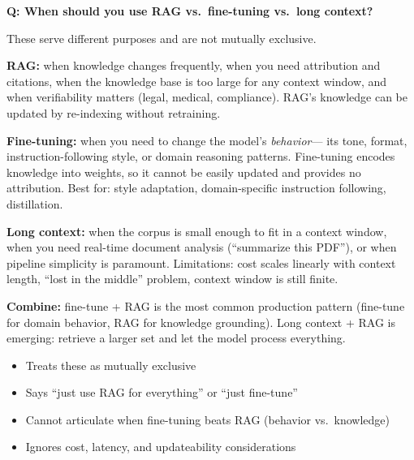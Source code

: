 \begin{interviewq}
\textbf{Q: When should you use RAG vs.\ fine-tuning vs.\ long context?}

 \quad {} \quad \badgefreq{\freqhigh}

\stronganswer
These serve different purposes and are not mutually exclusive.

\textbf{RAG:} when knowledge changes frequently, when you need attribution and
citations, when the knowledge base is too large for any context window, and when
verifiability matters (legal, medical, compliance).  RAG's knowledge can be
updated by re-indexing without retraining.

\textbf{Fine-tuning:} when you need to change the model's \emph{behavior}---
its tone, format, instruction-following style, or domain reasoning patterns.
Fine-tuning encodes knowledge into weights, so it cannot be easily updated
and provides no attribution.  Best for: style adaptation, domain-specific
instruction following, distillation.

\textbf{Long context:} when the corpus is small enough to fit in a context
window, when you need real-time document analysis (``summarize this PDF''),
or when pipeline simplicity is paramount.  Limitations: cost scales linearly
with context length, ``lost in the middle'' problem, context window is still
finite.

\textbf{Combine:} fine-tune + RAG is the most common production pattern
(fine-tune for domain behavior, RAG for knowledge grounding).  Long context
+ RAG is emerging: retrieve a larger set and let the model process everything.

\redflags
\begin{itemize}
    \item Treats these as mutually exclusive
    \item Says ``just use RAG for everything'' or ``just fine-tune''
    \item Cannot articulate when fine-tuning beats RAG (behavior vs.\ knowledge)
    \item Ignores cost, latency, and updateability considerations
\end{itemize}



\end{interviewq}
